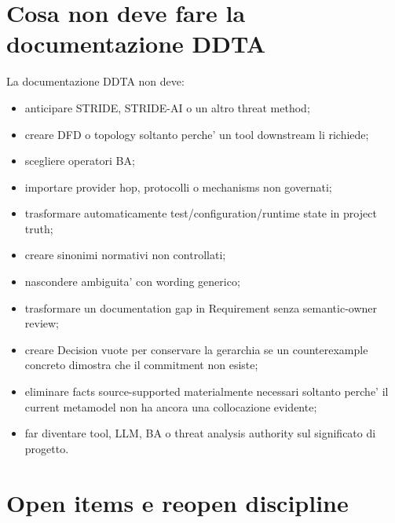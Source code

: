 \documentclass[11pt,a4paper]{article}
\begin{document}
\section{Cosa non deve fare la documentazione DDTA}

La documentazione DDTA non deve:
\begin{itemize}
  \item anticipare STRIDE, STRIDE-AI o un altro threat method;
  \item creare DFD o topology soltanto perche' un tool downstream li richiede;
  \item scegliere operatori BA;
  \item importare provider hop, protocolli o mechanisms non governati;
  \item trasformare automaticamente test/configuration/runtime state in project truth;
  \item creare sinonimi normativi non controllati;
  \item nascondere ambiguita' con wording generico;
  \item trasformare un documentation gap in Requirement senza semantic-owner review;
  \item creare Decision vuote per conservare la gerarchia se un counterexample concreto dimostra che il commitment non esiste;
  \item eliminare facts source-supported materialmente necessari soltanto perche' il current metamodel non ha ancora una collocazione evidente;
  \item far diventare tool, LLM, BA o threat analysis authority sul significato di progetto.
\end{itemize}

\section{Open items e reopen discipline}

\opentag
\end{document}
